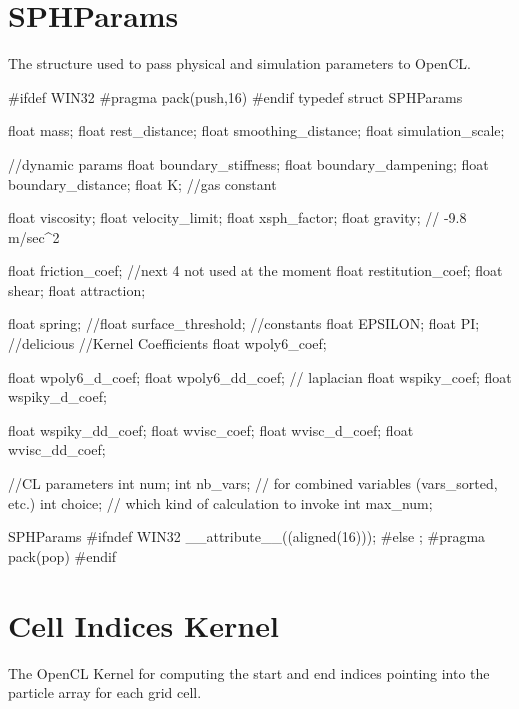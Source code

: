 \section{SPHParams}
\label{appendix:sphparams}
The structure used to pass physical and simulation parameters to OpenCL.
\begin{cppcode}{0}

#ifdef WIN32
#pragma pack(push,16)
#endif
typedef struct SPHParams
    {
        float mass;
        float rest_distance;
        float smoothing_distance;
        float simulation_scale;

        //dynamic params
        float boundary_stiffness;
        float boundary_dampening;
        float boundary_distance;
        float K;        //gas constant

        float viscosity;
        float velocity_limit;
        float xsph_factor;
        float gravity; // -9.8 m/sec^2

        float friction_coef;
        //next 4 not used at the moment
        float restitution_coef;
        float shear;
        float attraction;

        float spring;
        //float surface_threshold;
        //constants
        float EPSILON;
        float PI;       //delicious
        //Kernel Coefficients
        float wpoly6_coef;

        float wpoly6_d_coef;
        float wpoly6_dd_coef; // laplacian
        float wspiky_coef;
        float wspiky_d_coef;

        float wspiky_dd_coef;
        float wvisc_coef;
        float wvisc_d_coef;
        float wvisc_dd_coef;


        //CL parameters
        int num;
        int nb_vars; // for combined variables (vars_sorted, etc.)
        int choice; // which kind of calculation to invoke
        int max_num;

 } SPHParams
#ifndef WIN32
    __attribute__((aligned(16)));
#else
        ;
        #pragma pack(pop)
#endif

\end{cppcode}

\section{Cell Indices Kernel}
\label{appendix:cellindices}
The OpenCL Kernel for computing the start and end indices pointing into the
particle array for each grid cell.

